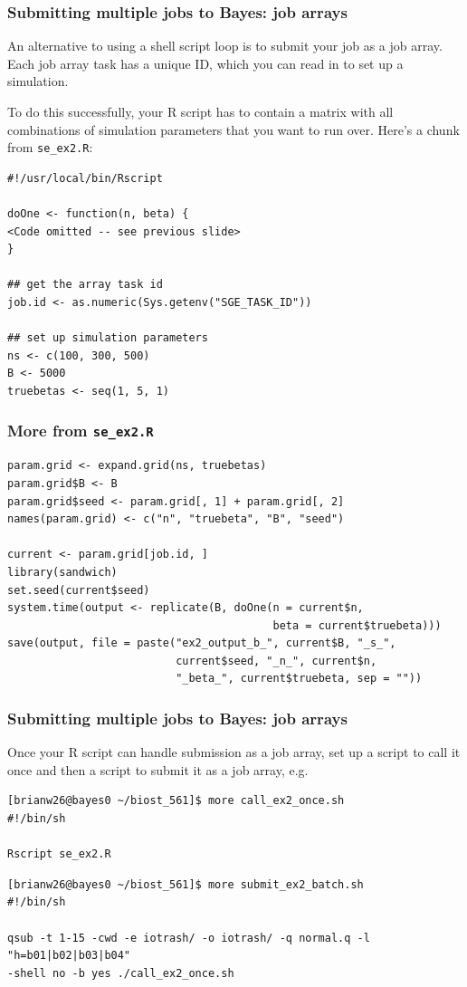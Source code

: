 \documentclass[12pt, 
hyperref={colorlinks=true, linkcolor=blue, urlcolor=cyan}]{beamer}
\begin{document}
\begin{frame}[fragile]
\frametitle{Submitting multiple jobs to Bayes: job arrays}
An alternative to using a shell script loop is to submit your job as a job array. Each job array task has a unique ID, which you can read in to set up a simulation.

To do this successfully, your R script has to contain a matrix with all combinations of simulation parameters that you want to run over. Here's a chunk from \texttt{se\_ex2.R}:
{\scriptsize
\begin{verbatim}
#!/usr/local/bin/Rscript

doOne <- function(n, beta) {
<Code omitted -- see previous slide>
}

## get the array task id
job.id <- as.numeric(Sys.getenv("SGE_TASK_ID"))

## set up simulation parameters
ns <- c(100, 300, 500)
B <- 5000
truebetas <- seq(1, 5, 1)
\end{verbatim}
}
\end{frame}

\begin{frame}[fragile]
\frametitle{More from \texttt{se\_ex2.R}}
{\scriptsize
\begin{verbatim}
param.grid <- expand.grid(ns, truebetas)
param.grid$B <- B
param.grid$seed <- param.grid[, 1] + param.grid[, 2]
names(param.grid) <- c("n", "truebeta", "B", "seed")

current <- param.grid[job.id, ]
library(sandwich)
set.seed(current$seed)
system.time(output <- replicate(B, doOne(n = current$n, 
                                         beta = current$truebeta)))
save(output, file = paste("ex2_output_b_", current$B, "_s_", 
                          current$seed, "_n_", current$n, 
                          "_beta_", current$truebeta, sep = ""))
\end{verbatim}
}
\end{frame}

\begin{frame}[fragile]
\frametitle{Submitting multiple jobs to Bayes: job arrays}
Once your R script can handle submission as a job array, set up a script to call it once and then a script to submit it as a job array, e.g.
{\scriptsize
\begin{verbatim}
[brianw26@bayes0 ~/biost_561]$ more call_ex2_once.sh
#!/bin/sh

Rscript se_ex2.R
\end{verbatim}
\begin{verbatim}
[brianw26@bayes0 ~/biost_561]$ more submit_ex2_batch.sh
#!/bin/sh

qsub -t 1-15 -cwd -e iotrash/ -o iotrash/ -q normal.q -l "h=b01|b02|b03|b04" 
-shell no -b yes ./call_ex2_once.sh
\end{verbatim}
}
\end{frame}
\end{document}
